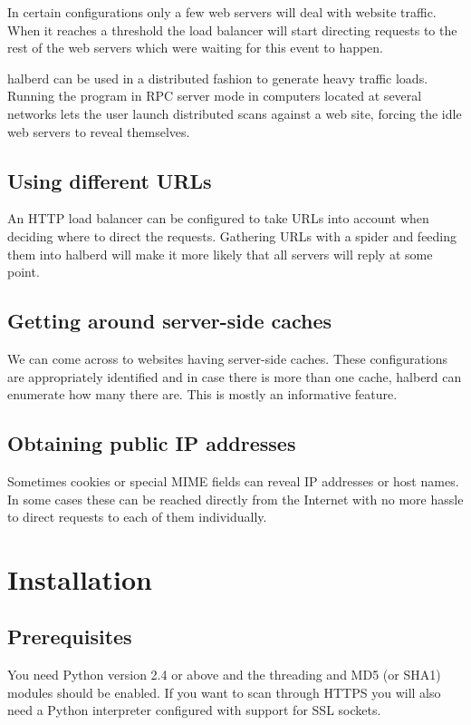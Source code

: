 \documentclass[a4paper]{book}
\begin{document}
In certain configurations only a few web servers will deal with website
traffic. When it reaches a threshold the load balancer will start directing
requests to the rest of the web servers which were waiting for this event to
happen.

halberd can be used in a distributed fashion to generate heavy traffic loads.
Running the program in RPC server mode in computers located at several
networks lets the user launch distributed scans against a web site, forcing
the idle web servers to reveal themselves.

\section{Using different URLs}

An HTTP load balancer can be configured to take URLs into account when
deciding where to direct the requests. Gathering URLs with a spider and
feeding them into halberd will make it more likely that all servers will reply
at some point.

\section{Getting around server-side caches}

We can come across to websites having server-side caches. These configurations
are appropriately identified and in case there is more than one cache, halberd
can enumerate how many there are. This is mostly an informative feature.

\section{Obtaining public IP addresses}

Sometimes cookies or special MIME fields can reveal IP addresses or host
names. In some cases these can be reached directly from the Internet with no
more hassle to direct requests to each of them individually.

\chapter{Installation}

\section{Prerequisites}

You need Python version 2.4 or above and the threading and MD5 (or SHA1)
modules should be enabled.  If you want to scan through HTTPS you will also
need a Python interpreter configured with support for SSL sockets.
\end{document}
